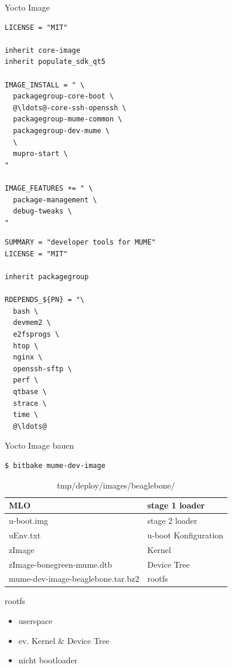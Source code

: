 \begin{frame}[fragile]{Yocto Image}
	\begin{multicols}{2}
		\begin{lstlisting}[title=mume-dev-image.bb,frame=single,language=bitbake]
LICENSE = "MIT"

inherit core-image
inherit populate_sdk_qt5

IMAGE_INSTALL = " \
  packagegroup-core-boot \
  @\ldots@-core-ssh-openssh \
  packagegroup-mume-common \
  packagegroup-dev-mume \
  \
  mupro-start \
"

IMAGE_FEATURES += " \
  package-management \
  debug-tweaks \
"
		\end{lstlisting}
		\begin{lstlisting}[title=packagegroup-dev-mume.bb, frame=single, numbers=right, language=bitbake]
SUMMARY = "developer tools for MUME"
LICENSE = "MIT"

inherit packagegroup

RDEPENDS_${PN} = "\
  bash \
  devmem2 \
  e2fsprogs \
  htop \
  nginx \
  openssh-sftp \
  perf \
  qtbase \
  strace \
  time \
  @\ldots@
		\end{lstlisting}
	\end{multicols}
\end{frame}

\begin{frame}[fragile]{Yocto Image bauen}
	\begin{lstlisting}[frame=single,language=bash]
$ bitbake mume-dev-image
	\end{lstlisting}
	\begin{table}
		\caption{tmp/deploy/images/beaglebone/}
		\begin{tabular}{ll}
			\hline MLO & stage 1 loader \\ 
			\hline u-boot.img & stage 2 loader \\ 
			\hline uEnv.txt & u-boot Konfiguration \\ 
			\hline zImage & Kernel \\ 
			\hline zImage-bonegreen-mume.dtb & Device Tree \\ 
			\hline mume-dev-image-beaglebone.tar.bz2 & rootfs \\ 
			\hline 
		\end{tabular} 
	\end{table}
\end{frame}

\begin{frame}{rootfs}
	\begin{itemize}
		\item userspace
		\item ev. Kernel \& Device Tree
		\item nicht bootloader
	\end{itemize}
\end{frame}

